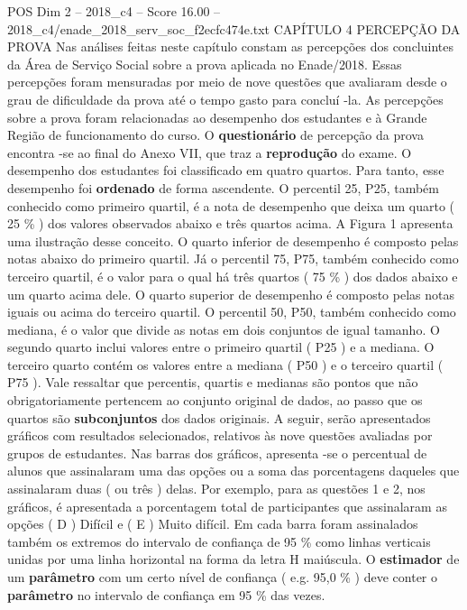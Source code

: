 \begin{textsample}{POS Dim 2 – 2018\_c4 – Score 16.00 – 2018\_c4/enade\_2018\_serv\_soc\_f2ecfc474e.txt}  \label{ex:f2_pos_058}
CAPÍTULO 4 PERCEPÇÃO DA PROVA Nas análises feitas neste capítulo constam as percepções dos concluintes da Área de Serviço Social sobre a prova aplicada no Enade/2018.
Essas percepções foram mensuradas por meio de nove questões que avaliaram desde o grau de dificuldade da prova até o tempo gasto para concluí -la.
As percepções sobre a prova foram relacionadas ao desempenho dos estudantes e à Grande Região de funcionamento do curso.
O \textbf{questionário} de percepção da prova encontra -se ao final do Anexo VII, que traz a \textbf{reprodução} do exame.
O desempenho dos estudantes foi classificado em quatro quartos.
Para tanto, esse desempenho foi \textbf{ordenado} de forma ascendente.
O percentil 25, P25, também conhecido como primeiro quartil, é a nota de desempenho que deixa um quarto ( 25 \% ) dos valores observados abaixo e três quartos acima.
A Figura 1 apresenta uma ilustração desse conceito.
O quarto inferior de desempenho é composto pelas notas abaixo do primeiro quartil.
Já o percentil 75, P75, também conhecido como terceiro quartil, é o valor para o qual há três quartos ( 75 \% ) dos dados abaixo e um quarto acima dele.
O quarto superior de desempenho é composto pelas notas iguais ou acima do terceiro quartil.
O percentil 50, P50, também conhecido como mediana, é o valor que divide as notas em dois conjuntos de igual tamanho.
O segundo quarto inclui valores entre o primeiro quartil ( P25 ) e a mediana.
O terceiro quarto contém os valores entre a mediana ( P50 ) e o terceiro quartil ( P75 ).
Vale ressaltar que percentis, quartis e medianas são pontos que não obrigatoriamente pertencem ao conjunto original de dados, ao passo que os quartos são \textbf{subconjuntos} dos dados originais.
A seguir, serão apresentados gráficos com resultados selecionados, relativos às nove questões avaliadas por grupos de estudantes.
Nas barras dos gráficos, apresenta -se o percentual de alunos que assinalaram uma das opções ou a soma das porcentagens daqueles que assinalaram duas ( ou três ) delas.
Por exemplo, para as questões 1 e 2, nos gráficos, é apresentada a porcentagem total de participantes que assinalaram as opções ( D ) Difícil e ( E ) Muito difícil.
Em cada barra foram assinalados também os extremos do intervalo de confiança de 95 \% como linhas verticais unidas por uma linha horizontal na forma da letra H maiúscula.
O \textbf{estimador} de um \textbf{parâmetro} com um certo nível de confiança ( e.g. 95,0 \% ) deve conter o \textbf{parâmetro} no intervalo de confiança em 95 \% das vezes.

\end{textsample}
